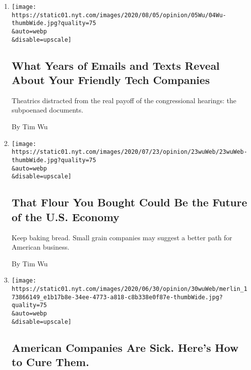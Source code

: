 \begin{enumerate}
\def\labelenumi{\arabic{enumi}.}
\item
  \href{/2020/08/04/opinion/amazon-facebook-congressional-hearings.html}{}

  \texttt{[image: https://static01.nyt.com/images/2020/08/05/opinion/05Wu/04Wu-thumbWide.jpg?quality=75\\\&auto=webp\\\&disable=upscale]}

  \hypertarget{what-years-of-emails-and-texts-reveal-about-your-friendly-tech-companies}{%
  \subsection{What Years of Emails and Texts Reveal About Your Friendly
  Tech
  Companies}\label{what-years-of-emails-and-texts-reveal-about-your-friendly-tech-companies}}

  Theatrics distracted from the real payoff of the congressional
  hearings: the subpoenaed documents.

  By Tim Wu
\item
  \href{/2020/07/24/opinion/us-grain-industry.html}{}

  \texttt{[image: https://static01.nyt.com/images/2020/07/23/opinion/23wuWeb/23wuWeb-thumbWide.jpg?quality=75\\\&auto=webp\\\&disable=upscale]}

  \hypertarget{that-flour-you-bought-could-be-the-future-of-the-us-economy}{%
  \subsection{That Flour You Bought Could Be the Future of the U.S.
  Economy}\label{that-flour-you-bought-could-be-the-future-of-the-us-economy}}

  Keep baking bread. Small grain companies may suggest a better path for
  American business.

  By Tim Wu
\item
  \href{/2020/06/30/opinion/sunday/mergers-buyouts-economy-inequality.html}{}

  \texttt{[image: https://static01.nyt.com/images/2020/06/30/opinion/30wuWeb/merlin\_173866149\_e1b17b8e-34ee-4773-a818-c8b338e0f87e-thumbWide.jpg?quality=75\\\&auto=webp\\\&disable=upscale]}

  \hypertarget{american-companies-are-sick-heres-how-to-cure-them}{%
  \subsection{American Companies Are Sick. Here's How to Cure
  Them.}\label{american-companies-are-sick-heres-how-to-cure-them}}


\end{enumerate}

